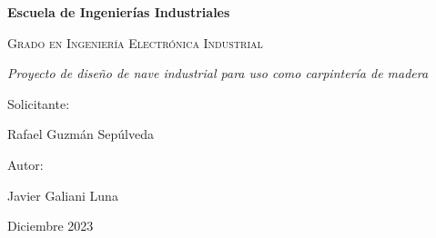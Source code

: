\documentclass[11pt]{report}
\def\TituloProyecto{Proyecto de diseño de nave industrial para uso como carpintería de madera}
\def\Facultad{Escuela de Ingenierías Industriales}
\def\Grado{Grado en Ingeniería Electrónica Industrial}
\def\Autor{Javier Galiani Luna}
\def\Solicitante{Rafael Guzmán Sepúlveda}
\def\Fecha{Diciembre 2023}
\begin{document}
\begin{titlepage}
    \centering
    {\bfseries\LARGE \Facultad \par}
    \vspace{0.5cm}
    {\scshape\Large \Grado \par}
    \vspace{3cm}
    {\itshape\Huge \TituloProyecto \par}
    \vfill
    {\Large Solicitante: \par}
    {\Large \Solicitante  \par}
    \vspace{1cm}
    {\Large Autor: \par}
    {\Large \Autor \par}
    \vfill
    {\Large \Fecha \par}
\end{titlepage}
\end{document}
